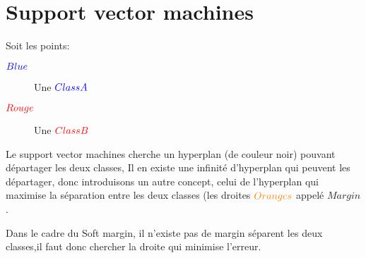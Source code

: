 
\section{Support vector machines}
Soit les points:
\begin{description}
\item[$\textcolor{blue}{Blue}$] Une $\textcolor{blue}{ClassA}$
\item[$\textcolor{red}{Rouge}$] Une $\textcolor{red}{ClassB}$
\end{description}
Le support vector machines cherche un hyperplan (de couleur noir) pouvant départager les deux classes,
Il en existe une infinité d'hyperplan qui peuvent les départager, donc introduisons un autre concept, celui de 
l'hyperplan qui maximise la séparation entre les deux classes (les droites $\textcolor{orange}{Oranges}$ appelé $Margin$.\\


Dans le cadre du Soft margin, il n'existe pas de margin séparent les deux classes,il faut donc chercher la droite qui minimise l'erreur.

\pagebreak
